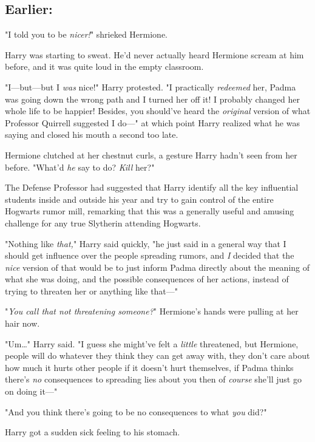 \subsection{Earlier:}

"I told you to be \emph{nicer!}" shrieked Hermione.

Harry was starting to sweat. He'd never actually heard Hermione scream at him 
before, and it was quite loud in the empty classroom.

"I---but---but I \emph{was} nice!" Harry protested. "I practically 
\emph{redeemed} her, Padma was going down the wrong path and I turned her off 
it! I probably changed her whole life to be happier! Besides, you should've 
heard the \emph{original} version of what Professor Quirrell suggested I do---" 
at which point Harry realized what he was saying and closed his mouth a second 
too late.

Hermione clutched at her chestnut curls, a gesture Harry hadn't seen from her 
before. "What'd \emph{he} say to do? \emph{Kill} her?"

The Defense Professor had suggested that Harry identify all the key influential 
students inside and outside his year and try to gain control of the entire 
Hogwarts rumor mill, remarking that this was a generally useful and amusing 
challenge for any true Slytherin attending Hogwarts.

"Nothing like \emph{that,}" Harry said quickly, "he just said in a general way 
that I should get influence over the people spreading rumors, and \emph{I} 
decided that the \emph{nice} version of that would be to just inform Padma 
directly about the meaning of what she was doing, and the possible consequences 
of her actions, instead of trying to threaten her or anything like that---"

"\emph{You call that not threatening someone?}" Hermione's hands were pulling 
at her hair now.

"Um{\ldots}" Harry said. "I guess she might've felt a \emph{little} threatened, 
but Hermione, people will do whatever they think they can get away with, they 
don't care about how much it hurts other people if it doesn't hurt themselves, 
if Padma thinks there's \emph{no} consequences to spreading lies about you then 
of \emph{course} she'll just go on doing it---"

"And you think there's going to be no consequences to what \emph{you} did?"

Harry got a sudden sick feeling to his stomach.

